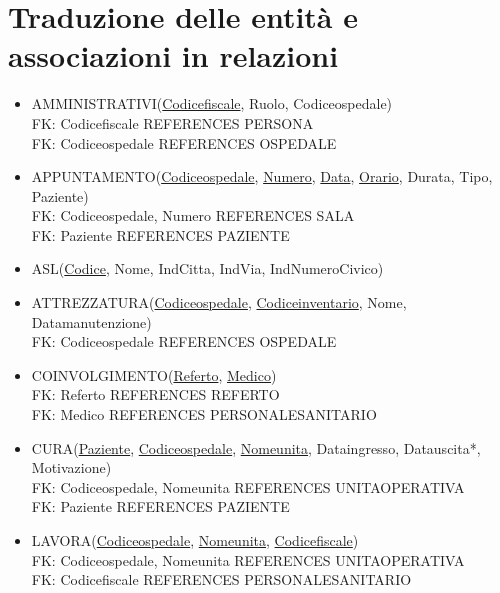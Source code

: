 \documentclass[a4paper,12pt]{report}
\begin{document}
\section{Traduzione delle entità e associazioni in relazioni}
\begin{itemize}
  \item AMMINISTRATIVI(\underline{Codice\textunderscore fiscale}, Ruolo, Codice\textunderscore ospedale) 
  \\ FK: Codice\textunderscore fiscale REFERENCES PERSONA
  \\ FK: Codice\textunderscore ospedale REFERENCES OSPEDALE
  \item APPUNTAMENTO(\underline{Codice\textunderscore ospedale}, \underline{Numero}, \underline{Data}, \underline{Orario}, Durata, Tipo, Paziente)
  \\ FK: Codice\textunderscore ospedale, Numero REFERENCES SALA
  \\ FK: Paziente REFERENCES PAZIENTE
  \item ASL(\underline{Codice}, Nome, Ind\textunderscore Citta, Ind\textunderscore Via, Ind\textunderscore Numero\textunderscore Civico)
  \item ATTREZZATURA(\underline{Codice\textunderscore ospedale}, \underline{Codice\textunderscore inventario}, Nome, Data\textunderscore manutenzione)
  \\ FK: Codice\textunderscore ospedale REFERENCES OSPEDALE
  \item COINVOLGIMENTO(\underline{Referto}, \underline{Medico})
  \\ FK: Referto REFERENCES REFERTO
  \\ FK: Medico REFERENCES PERSONALE\textunderscore SANITARIO
  \item CURA(\underline{Paziente}, \underline{Codice\textunderscore ospedale}, \underline{Nome\textunderscore unita}, Data\textunderscore ingresso, Data\textunderscore uscita*, Motivazione)
  \\ FK: Codice\textunderscore ospedale, Nome\textunderscore unita REFERENCES UNITA\textunderscore OPERATIVA
  \\ FK: Paziente REFERENCES PAZIENTE
  \item LAVORA(\underline{Codice\textunderscore ospedale}, \underline{Nome\textunderscore unita}, \underline{Codice\textunderscore fiscale})
  \\ FK: Codice\textunderscore ospedale, Nome\textunderscore unita REFERENCES UNITA\textunderscore OPERATIVA
  \\ FK: Codice\textunderscore fiscale REFERENCES PERSONALE\textunderscore SANITARIO

\end{itemize}
\end{document}
